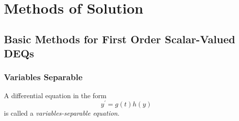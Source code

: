 \documentclass{article}
\newcounter{definition}[section]
\begin{document}
\section{Methods of Solution}

  \subsection{Basic Methods for First Order Scalar-Valued DEQs}

    \subsubsection{Variables Separable}

      \begin{definition}
        \label{def:separable-deqs-and-solution}
      A differential equation in the form
      \begin{equation}
        y^\prime = g(t) h(y)
      \end{equation}
      is called a \textit{variables-separable equation}. 


\end{definition}
\end{document}
